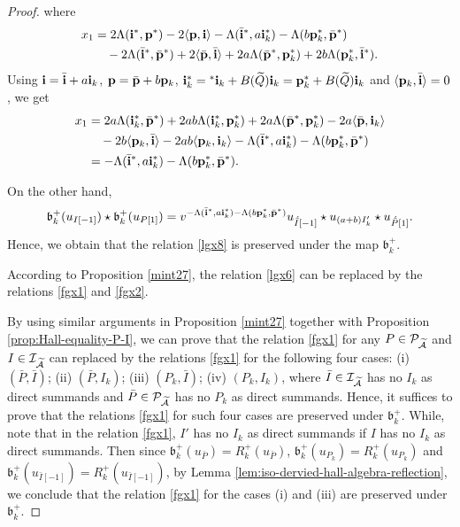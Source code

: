 \documentclass[reqno,12pt]{amsart}
\numberwithin{equation}{section}
\def\lr#1{\langle #1\rangle} \def\fin{\hfill$\square$}  \def\lra{\longrightarrow} \def\mod{\mbox{\rm \textbf{mod}}\,}\def\Mod{\mbox{\rm mod}\,}\def\top{\mbox{\rm top}\,}\def\soc{\mbox{\rm soc}\,}
\theoremstyle{plain} %
\theoremstyle{definition} %
\begin{document}
\begin{proof}
where \begin{align*}x_1&=2\Lambda({\bf i}^\ast, {\bf p}^\ast)-2\langle {\bf p}, {\bf i}\rangle-\Lambda(\bar{\bf i}^\ast, a{\bf i}_k^\ast)-\Lambda(b{\bf p}_k^\ast,{\bar{\bf p}}^\ast)\\&\quad-2\Lambda({\bar{\bf i}}^\ast, {\bar{\bf p}}^\ast)+2\langle \bar{{\bf p}},\bar{\bf i}\rangle+2a\Lambda({\bar{\bf p}}^\ast,{\bf p}_k^\ast)+2b\Lambda({\bf p}_k^\ast,{\bar{\bf i}}^\ast).\end{align*}
Using ${\bf i}=\bar{{\bf i}}+a{\bf i}_k$, ${\bf p}=\bar{{\bf p}}+b{\bf p}_k$, ${\bf i}_k^\ast={^\ast{{\bf i}_k}}+B(\widetilde{Q}){\bf i}_k={\bf p}_k^\ast+B(\widetilde{Q}){\bf i}_k$ and $\lr{{\bf p}_k,{\bar{\bf i}}}=0$, we get
\begin{align*}x_1&=2a\Lambda({\bf i}_k^\ast,{\bar{\bf p}}^\ast)+2ab\Lambda({\bf i}_k^\ast,{\bf p}_k^\ast)
+2a\Lambda({\bar{\bf p}}^\ast,{\bf p}_k^\ast)-2a\lr{{\bar{\bf p}},{\bf i}_k}\\&\quad-2b\lr{{\bf p}_k,{\bar{\bf i}}}-2ab\lr{{\bf p}_k,{\bf i}_k}-\Lambda(\bar{\bf i}^\ast, a{\bf i}_k^\ast)-\Lambda(b{\bf p}_k^\ast,{\bar{\bf p}}^\ast)\\
&=-\Lambda(\bar{\bf i}^\ast, a{\bf i}_k^\ast)-\Lambda(b{\bf p}_k^\ast,{\bar{\bf p}}^\ast).\end{align*}


On the other hand,
\[\mathfrak{b}_k^+(u_{I[-1]})\star \mathfrak{b}_k^+(u_{P[1]})=v^{-\Lambda(\bar{\bf i}^\ast, a{\bf i}_k^\ast)-\Lambda(b{\bf p}_k^\ast,{\bar{\bf p}}^\ast)}u_{\acute{\bar{I}}[-1]}\star u_{(a+b)I_k'}\star u_{\acute{\bar{P}}[1]}.
	 \]
Hence, we obtain that the relation \eqref{lgx8} is preserved under the map $\mathfrak{b}_k^+$.

According to Proposition \ref{mint27}, the relation \eqref{lgx6} can be replaced by the relations \eqref{fgx1} and \eqref{fgx2}.
	
 By using similar arguments in Proposition \ref{mint27} together with Proposition \ref{prop:Hall-equality-P-I}, we can prove that the relation \eqref{fgx1} for any $P\in\mathcal{P}_{\widetilde{\mathcal{A}}}$ and $I\in\mathcal{I}_{\widetilde{\mathcal{A}}}$ can replaced by the relations \eqref{fgx1} for the following four cases: (i) $(\bar{P},\bar{I})$; (ii) $(\bar{P}, I_k)$; (iii) $(P_k,\bar{I})$; (iv) $(P_k,I_k)$, where $\bar{I}\in\mathcal{I}_{\widetilde{\mathcal{A}}}$ has no $I_k$ as direct summands and $\bar{P}\in\mathcal{P}_{\widetilde{\mathcal{A}}}$ has no $P_k$ as direct summands.
Hence, it suffices to prove that the relations \eqref{fgx1} for such four cases are preserved under $\mathfrak{b}_k^+$. While, note that in the relation \eqref{fgx1}, $I'$ has no $I_k$ as direct summands if $I$ has no $I_k$ as direct summands. Then since $\mathfrak{b}_k^+(u_{\bar{P}})=R_k^+(u_{\bar{P}})$, $\mathfrak{b}_k^+(u_{P_k})=R_k^+(u_{P_k})$ and $\mathfrak{b}_k^+(u_{\bar{I}[-1]})=R_k^+(u_{\bar{I}[-1]})$, by Lemma \ref{lem:iso-dervied-hall-algebra-reflection}, we conclude that the relation \eqref{fgx1} for the cases (i) and (iii) are preserved under $\mathfrak{b}_k^+$.


\end{proof}
\end{document}
